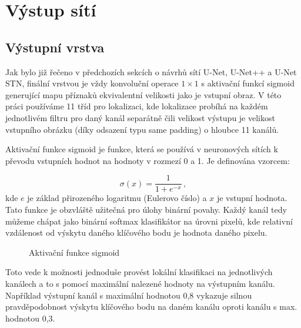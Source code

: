 \section{Výstup sítí}
\label{sec:Chapter46}
\subsection{Výstupní vrstva}
Jak bylo již řečeno v předchozích sekcích o návrhů sítí U-Net, U-Net++ a U-Net STN, finální vrstvou je vždy konvoluční operace $1\times1$ s aktivační funkcí sigmoid generující mapu příznaků ekvivalentní velikosti jako je vstupní obraz. V této práci používáme 11 tříd pro lokalizaci, kde lokalizace probíhá na každém jednotlivém filtru pro daný kanál separátně čili velikost výstupu je velikost vstupního obrázku (díky odsazení typu same padding) o hloubce 11 kanálů.

Aktivační funkce sigmoid je funkce, která se používá v neuronových sítích k převodu vstupních hodnot na hodnoty v rozmezí 0 a 1. Je definována vzorcem:

\begin{equation}
\sigma(x) = \frac{1}{1+e^{-x}}\,,
\end{equation}
kde $e$ je základ přirozeného logaritmu (Eulerovo číslo) a $x$ je vstupní hodnota. Tato funkce je obzvláště užitečná pro úlohy binární povahy. Každý kanál tedy můžeme chápat jako binární softmax klasifikátor na úrovni pixelů, kde relativní vzdálenost od výskytu daného klíčového bodu je hodnota daného pixelu.

\begin{figure}[H]
    \centering
    \caption[Aktivační funkce sigmoid]{Aktivační funkce sigmoid}
    \label{fig:sigmoid}
\end{figure}

Toto vede k možnosti jednoduše provést lokální klasifikaci na jednotlivých kanálech a to s pomocí maximální nalezené hodnoty na výstupním kanálu. Například výstupní kanál s maximální hodnotou 0,8 vykazuje silnou pravděpodobnost výskytu klíčového bodu na daném kanálu oproti kanálu s max. hodnotou 0,3.

